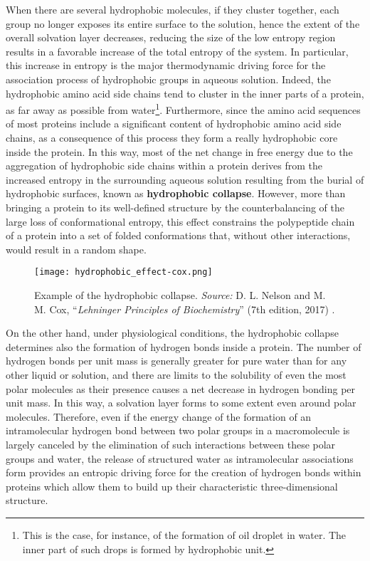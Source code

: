 When there are several hydrophobic molecules, if they cluster together, each group no longer exposes its entire surface to the solution, hence the extent of the overall solvation layer decreases, reducing the size of the low entropy region results in a favorable increase of the total entropy of the system. In particular, this increase in entropy is the major thermodynamic driving force for the association process of hydrophobic groups in aqueous solution. Indeed, the hydrophobic amino acid side chains tend to cluster in the inner parts of a protein, as far away as possible from water\footnote{This is the case, for instance, of the formation of oil droplet in water. The inner part of such drops is formed by hydrophobic unit.}. Furthermore, since the amino acid sequences of most proteins include a significant content of hydrophobic amino acid side chains, as a consequence of this process they form a really hydrophobic core inside the protein. In this way, most of the net change in free energy due to the aggregation of hydrophobic side chains within a protein derives from the increased entropy in the surrounding aqueous solution resulting from the burial of hydrophobic surfaces, known as \textbf{hydrophobic collapse}. 
However, more than bringing a protein to its well-defined structure by the counterbalancing of the large loss of conformational entropy, this effect constrains the polypeptide chain of a protein into a set of folded conformations that, without other interactions, would result in a random shape. 
\begin{figure}[h]
\centering
\begin{minipage}[t]{0.9\textwidth}
\centering
\texttt{[image: hydrophobic\_effect-cox.png]}

\caption{\small{Example of the hydrophobic collapse.
    \textit{Source:} D. L. Nelson and M. M. Cox, ``\textit{Lehninger Principles of Biochemistry}'' (7th edition, 2017) 
    \cite{nelson2017lehninger}.}
}
 

\label{fig:ubq}
\end{minipage} 
\end{figure}

On the other hand, under physiological conditions, the hydrophobic collapse determines also the formation of hydrogen bonds inside a protein. The number of hydrogen bonds per unit mass is generally greater for pure water than for any other liquid or solution, and there are limits to the solubility of even the most polar molecules as their presence causes a net decrease in hydrogen bonding per unit mass. In this way, a solvation layer forms to some extent even around polar molecules. Therefore, even if the energy change of the formation of an intramolecular hydrogen bond between two polar groups in a macromolecule is largely canceled by the elimination of such interactions between these polar groups and water, the release of structured water as intramolecular associations form provides an entropic driving force for the creation of hydrogen bonds within proteins which allow them to build up their characteristic three-dimensional structure. 

